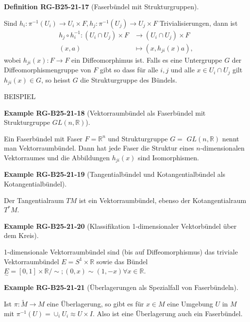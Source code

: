 \documentclass[10pt, letterpaper]{article}
\newcommand{\CustomHeading}[3]{%
  \par\medskip\noindent%
  \textbf{#1 #2} \textnormal{(#3)}.\enskip%
}
\newenvironment{DEF}[2]{\begin{unitbox}\CustomHeading{Definition}{#1}{#2}}{\end{unitbox}}
\newenvironment{EXA}[2]{\begin{unitbox}\CustomHeading{Example}{#1}{#2}}{\end{unitbox}}
\begin{document}
\begin{DEF}{RG-B25-21-17}{Faserbündel mit Strukturgruppen}
Sind $h_{i}: \pi^{-1}\left(U_{i}\right) \rightarrow U_{i} \times F, h_{j}: \pi^{-1}\left(U_{j}\right) \rightarrow U_{j} \times F$ Trivialisierungen, dann ist
$$
\begin{aligned}
h_{j} \circ h_{i}^{-1}:\left(U_{i} \cap U_{j}\right) \times F & \rightarrow\left(U_{i} \cap U_{j}\right) \times F \\
(x, a) & \mapsto\left(x, h_{j i}(x) a\right),
\end{aligned}
$$
wobei $h_{j i}(x): F \rightarrow F$ ein Diffeomorphimus ist. Falls es eine Untergruppe $G$ der Diffeomorphismengruppe von $F$ gibt so dass für alle $i, j$ und alle $x \in U_{i} \cap U_{j}$ gilt $h_{j i}(x) \in G$, so heisst $G$ die Strukturgruppe des Bündels.
\end{DEF}

BEISPIEL


\begin{EXA}{RG-B25-21-18}{Vektorraumbündel als Faserbündel mit Strukturgruppe $G L(n, \mathbb{R})$}
Ein Faserbündel mit Faser $F=\mathbb{R}^{n}$ und Strukturgruppe $G=$ $G L(n, \mathbb{R})$ nennt man Vektorraumbündel. Dann hat jede Faser die Struktur eines $n$-dimensionalen Vektorraumes und die Abbildungen $h_{j i}(x)$ sind Isomorphismen.
\end{EXA}


\begin{EXA}{RG-B25-21-19}{Tangentialbündel und Kotangentialbündel als Kotangentialbündel}
Der Tangentialraum $T M$ ist ein Vektorraumbündel, ebenso der Kotangentialraum $T^{*} M$.
\end{EXA}


\begin{EXA}{RG-B25-21-20}{Klassifikation 1-dimensionaler Vektorbündel über dem Kreis}
1-dimensionale Vektorraumbündel sind (bis auf Diffeomorphismus) das triviale Vektorraumbündel $E=S^{1} \times \mathbb{R}$ sowie das Bündel $\underset{\sim}{E}=[0,1] \times \mathbb{R} / \sim ;(0, x) \sim(1,-x) \forall x \in \mathbb{R}$.
\end{EXA}


\begin{EXA}{RG-B25-21-21}{Überlagerungen als Spezialfall von Faserbündeln}
Ist $\pi: \tilde{M} \rightarrow M$ eine Überlagerung, so gibt es für $x \in M$ eine Umgebung $U$ in $M$ mit $\pi^{-1}(U)=\cup_{i} U_{i} \approx U \times I$. Also ist eine Überlagerung auch ein Faserbündel.
\end{EXA}
\end{document}
